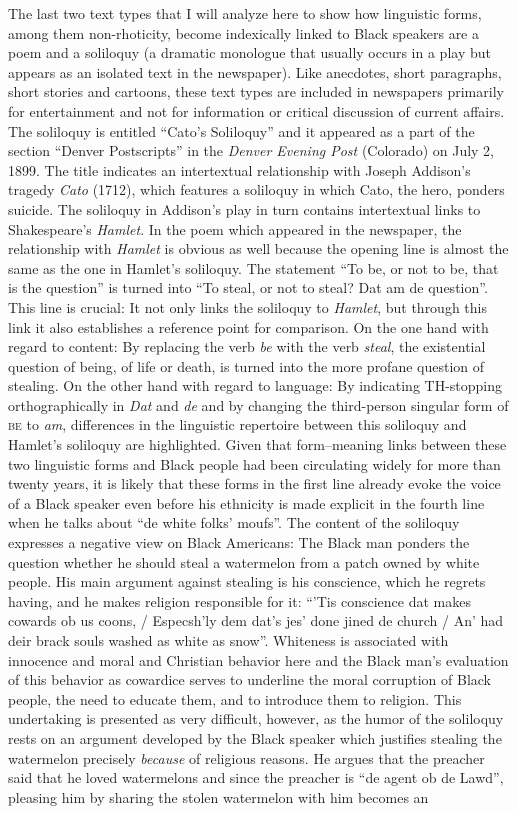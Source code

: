 The last two text types that I will analyze here to show how linguistic forms, among them non-rhoticity, become indexically linked to Black speakers are a poem and a soliloquy (a dramatic monologue that usually occurs in a play but appears as an isolated text in the newspaper). Like anecdotes, short paragraphs, short stories and cartoons, these text types are included in newspapers primarily for entertainment and not for information or critical discussion of current affairs. The soliloquy is entitled “Cato’s Soliloquy” and it appeared as a part of the section “Denver Postscripts” in the \emph{Denver Evening Post} (Colorado) on July 2, 1899. The title indicates an intertextual relationship with Joseph Addison’s tragedy \emph{Cato} (1712), which features a soliloquy in which Cato, the hero, ponders suicide. The soliloquy in Addison’s play in turn contains intertextual links to Shakespeare’s \emph{Hamlet}. In the poem which appeared in the newspaper, the relationship with \emph{Hamlet} is obvious as well because the opening line is almost the same as the one in Hamlet’s soliloquy. The statement “To be, or not to be, that is the question” is turned into “To steal, or not to steal? Dat am de question”. This line is crucial: It not only links the soliloquy to \emph{Hamlet}, but through this link it also establishes a reference point for comparison. On the one hand with regard to content: By replacing the verb \emph{be} with the verb \emph{steal}, the existential question of being, of life or death, is turned into the more profane question of stealing. On the other hand with regard to language: By indicating TH-stopping orthographically in \emph{Dat} and \emph{de} and by changing the third-person singular form of \textsc{be} to \emph{am}, differences in the linguistic repertoire between this soliloquy and Hamlet’s soliloquy are highlighted. Given that form–meaning links between these two linguistic forms and Black people had been circulating widely for more than twenty years, it is likely that these forms in the first line already evoke the voice of a Black speaker even before his ethnicity is made explicit in the fourth line when he talks about “de white folks’ moufs”. The content of the soliloquy expresses a negative view on Black Americans: The Black man ponders the question whether he should steal a watermelon from a patch owned by white people. His main argument against stealing is his conscience, which he regrets having, and he makes religion responsible for it: “’Tis conscience dat makes cowards ob us coons, / Especsh’ly dem dat’s jes’ done jined de church / An’ had deir brack souls washed as white as snow”. Whiteness is associated with innocence and moral and Christian behavior here and the Black man’s evaluation of this behavior as cowardice serves to underline the moral corruption of Black people, the need to educate them, and to introduce them to religion. This undertaking is presented as very difficult, however, as the humor of the soliloquy rests on an argument developed by the Black speaker which justifies stealing the watermelon precisely \emph{because} of religious reasons. He argues that the preacher said that he loved watermelons and since the preacher is “de agent ob de Lawd”, pleasing him by sharing the stolen watermelon with him becomes an 